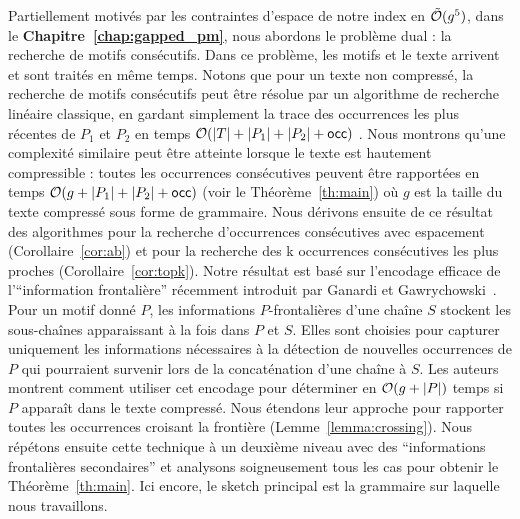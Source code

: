 Partiellement motivés par les contraintes d'espace de notre index en $\tilde {\mathcal{O}}(g^5)$, dans le \textbf{Chapitre~\ref{chap:gapped_pm}}, nous abordons le problème dual : la recherche de motifs consécutifs. Dans ce problème, les motifs et le texte arrivent et sont traités en même temps. Notons que pour un texte non compressé, la recherche de motifs consécutifs peut être résolue par un algorithme de recherche linéaire classique, en gardant simplement la trace des occurrences les plus récentes de $P_1$ et $P_2$ en temps $\mathcal{O}(|T|+|P_1|+|P_2|+\mathsf{occ})$ .
Nous montrons qu'une complexité similaire peut être atteinte lorsque le texte est hautement compressible : toutes les occurrences consécutives peuvent être rapportées en temps $\mathcal{O}(g+|P_1|+|P_2|+\mathsf{occ})$ (voir le Théorème~\ref{th:main}) où $g$ est la taille du texte compressé sous forme de grammaire. Nous dérivons ensuite de ce résultat des algorithmes pour la recherche d'occurrences consécutives avec espacement (Corollaire~\ref{cor:ab}) et pour la recherche des k occurrences consécutives les plus proches (Corollaire~\ref{cor:topk}).
%
Notre résultat est basé sur l'encodage efficace de l'``information frontalière'' récemment introduit par Ganardi et Gawrychowski~\cite{DBLP:conf/soda/GanardiG22}. Pour un motif donné $P$, les informations $P$-frontalières d'une chaîne $S$ stockent les sous-chaînes apparaissant à la fois dans $P$ et $S$. Elles sont choisies pour capturer uniquement les informations nécessaires à la détection de nouvelles occurrences de $P$ qui pourraient survenir lors de la concaténation d'une chaîne à $S$. 
%
Les auteurs montrent comment utiliser cet encodage pour déterminer en $\mathcal{O}(g+|P|)$ temps si $P$ apparaît dans le texte compressé. Nous étendons leur approche pour rapporter toutes les occurrences croisant la frontière (Lemme~\ref{lemma:crossing}). Nous répétons ensuite cette technique à un deuxième niveau avec des ``informations frontalières secondaires'' et analysons soigneusement tous les cas pour obtenir le Théorème~\ref{th:main}. Ici encore, le sketch principal est la grammaire sur laquelle nous travaillons.\\



